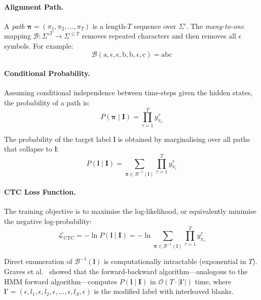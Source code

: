 \documentclass[11pt, a4paper]{article}
\newcommand{\Loss}{\mathcal{L}}
\begin{document}
\paragraph{Alignment Path.}
A \emph{path} $\boldsymbol{\pi} = (\pi_1, \pi_2, \ldots, \pi_T)$ is a length-$T$ sequence over $\Sigma'$. The \emph{many-to-one} mapping $\mathcal{B}: \Sigma'^T \to \Sigma^{\leq T}$ removes repeated characters and then removes all $\epsilon$ symbols. For example:
\[
  \mathcal{B}(\text{a}, \epsilon, \epsilon, \text{b}, \text{b}, \epsilon, \text{c}) = \text{abc}
\]

\paragraph{Conditional Probability.}
Assuming conditional independence between time-steps given the hidden states, the probability of a path is:
\begin{equation}\label{eq:path_prob}
  P(\boldsymbol{\pi} \mid \mathbf{I}) = \prod_{\tau=1}^{T} y_{\pi_\tau}^\tau
\end{equation}

The probability of the target label $\mathbf{l}$ is obtained by marginalising over all paths that collapse to $\mathbf{l}$:
\begin{equation}\label{eq:ctc_marginal}
  \boxed{P(\mathbf{l} \mid \mathbf{I}) = \sum_{\boldsymbol{\pi} \in \mathcal{B}^{-1}(\mathbf{l})} \prod_{\tau=1}^{T} y_{\pi_\tau}^\tau}
\end{equation}

\paragraph{CTC Loss Function.}
The training objective is to maximise the log-likelihood, or equivalently minimise the negative log-probability:
\begin{equation}\label{eq:ctc_loss}
  \boxed{\Loss_{\text{CTC}} = -\ln P(\mathbf{l} \mid \mathbf{I}) = -\ln \sum_{\boldsymbol{\pi} \in \mathcal{B}^{-1}(\mathbf{l})} \prod_{\tau=1}^{T} y_{\pi_\tau}^\tau}
\end{equation}

Direct enumeration of $\mathcal{B}^{-1}(\mathbf{l})$ is computationally intractable (exponential in $T$). Graves et al.~\cite{graves2006ctc} showed that the forward-backward algorithm—analogous to the HMM forward algorithm—computes $P(\mathbf{l} \mid \mathbf{I})$ in $\mathcal{O}(T \cdot |\mathbf{l}'|)$ time, where $\mathbf{l}' = (\epsilon, l_1, \epsilon, l_2, \epsilon, \ldots, \epsilon, l_S, \epsilon)$ is the modified label with interleaved blanks.
\end{document}
